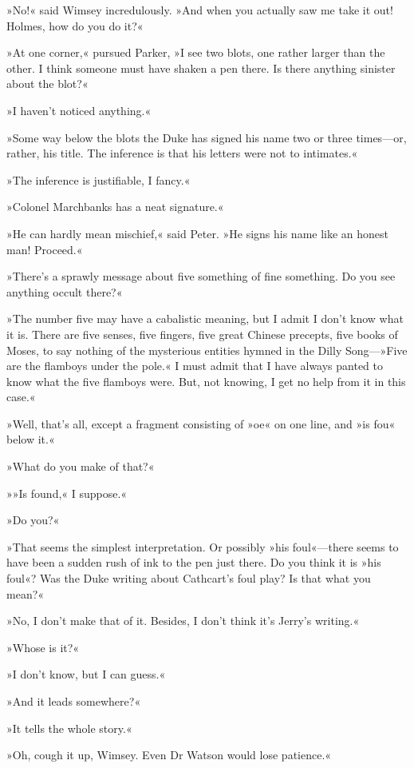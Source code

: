 »No!« said Wimsey incredulously. »And when you actually saw me take it out! Holmes, how do you do it?«

»At one corner,« pursued Parker, »I see two blots, one rather larger than the other. I think someone must have shaken a pen there. Is there anything sinister about the blot?«

»I haven't noticed anything.«

»Some way below the blots the Duke has signed his name two or three times—or, rather, his title. The inference is that his letters were not to intimates.«

»The inference is justifiable, I fancy.«

»Colonel Marchbanks has a neat signature.«

»He can hardly mean mischief,« said Peter. »He signs his name like an honest man! Proceed.«

»There's a sprawly message about five something of fine something. Do you see anything occult there?«

»The number five may have a cabalistic meaning, but I admit I don't know what it is. There are five senses, five fingers, five great Chinese precepts, five books of Moses, to say nothing of the mysterious entities hymned in the Dilly Song—»Five are the flamboys under the pole.« I must admit that I have always panted to know what the five flamboys were. But, not knowing, I get no help from it in this case.«

»Well, that's all, except a fragment consisting of »oe« on one line, and »is fou\longdash« below it.«

»What do you make of that?«

»»Is found,« I suppose.«

»Do you?«

»That seems the simplest interpretation. Or possibly »his foul«—there seems to have been a sudden rush of ink to the pen just there. Do you think it is »his foul«? Was the Duke writing about Cathcart's foul play? Is that what you mean?«

»No, I don't make that of it. Besides, I don't think it's Jerry's writing.«

»Whose is it?«

»I don't know, but I can guess.«

»And it leads somewhere?«

»It tells the whole story.«

»Oh, cough it up, Wimsey. Even Dr Watson would lose patience.«

